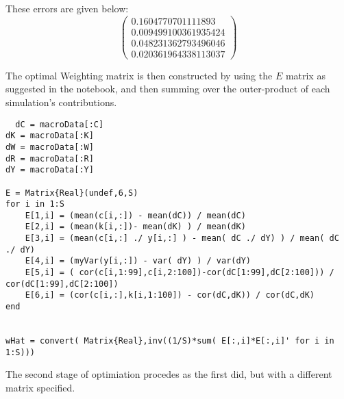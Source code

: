 \documentclass[12pt]{paper}
\begin{document}
These errors are given below:
\begin{equation*}
  \begin{pmatrix}
0.1604770701111893\\  
 0.009499100361935424\\
 0.048231362793496046\\
 0.020361964338113037
  \end{pmatrix}
\end{equation*}

The optimal Weighting matrix is then constructed by using the $E$
matrix as suggested in the notebook, and then summing over the
outer-product of each simulation's contributions.

\begin{verbatim}
  dC = macroData[:C]
dK = macroData[:K]
dW = macroData[:W]
dR = macroData[:R]
dY = macroData[:Y]

E = Matrix{Real}(undef,6,S)
for i in 1:S
    E[1,i] = (mean(c[i,:]) - mean(dC)) / mean(dC)
    E[2,i] = (mean(k[i,:])- mean(dK) ) / mean(dK)
    E[3,i] = (mean(c[i,:] ./ y[i,:] ) - mean( dC ./ dY) ) / mean( dC ./ dY)
    E[4,i] = (myVar(y[i,:]) - var( dY) ) / var(dY)
    E[5,i] = ( cor(c[i,1:99],c[i,2:100])-cor(dC[1:99],dC[2:100])) / cor(dC[1:99],dC[2:100])
    E[6,i] = (cor(c[i,:],k[i,1:100]) - cor(dC,dK)) / cor(dC,dK)
end


wHat = convert( Matrix{Real},inv((1/S)*sum( E[:,i]*E[:,i]' for i in 1:S)))
\end{verbatim}

The second stage of optimiation procedes as the first did, but with a
different matrix specified. 
\end{document}
